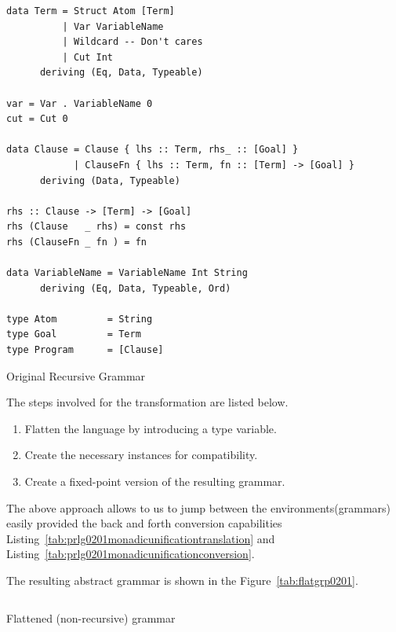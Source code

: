 \documentclass[thesis-solanki.tex]{subfiles}
\begin{document}
\begin{code-list}[h]
	\begin{singlespace}
		\begin{verbatim}
data Term = Struct Atom [Term]
          | Var VariableName
          | Wildcard -- Don't cares
          | Cut Int
      deriving (Eq, Data, Typeable)

var = Var . VariableName 0
cut = Cut 0

data Clause = Clause { lhs :: Term, rhs_ :: [Goal] }
            | ClauseFn { lhs :: Term, fn :: [Term] -> [Goal] }
      deriving (Data, Typeable)

rhs :: Clause -> [Term] -> [Goal]
rhs (Clause   _ rhs) = const rhs
rhs (ClauseFn _ fn ) = fn

data VariableName = VariableName Int String
      deriving (Eq, Data, Typeable, Ord)

type Atom         = String
type Goal         = Term
type Program      = [Clause]
		\end{verbatim}
	\end{singlespace}
	\caption{Original Recursive Grammar}
\label{tab:origgramp0201}
\end{code-list}


The steps involved for the transformation are listed below.
\begin{enumerate}
\item Flatten the language by introducing a type variable.

\item Create the necessary instances for \cite{unification-fd-lib} compatibility.

\item Create a fixed-point version of the resulting grammar.
\end{enumerate}

The above approach allows to us to jump between the environments(grammars) easily provided the back and forth conversion capabilities 
Listing~\ref{tab:prlg0201monadicunificationtranslation} and Listing~\ref{tab:prlg0201monadicunificationconversion}.

The resulting abstract grammar is shown in the Figure~\ref{tab:flatgrp0201}.


\begin{code-list}[th]
  \begin{singlespace}
    \inputminted[linenos]{haskell}{haskell-proto2-flattened-rarefy.hs}
  \end{singlespace}
  \caption{Flattened (non-recursive) grammar}
\label{tab:flatgrp0201}
\end{code-list}
\end{document}
